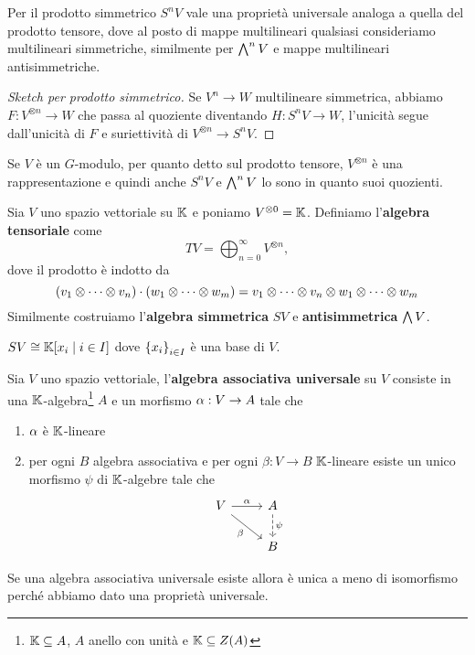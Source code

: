 \begin{remark}
Per il prodotto simmetrico $S^nV$ vale una propriet\`a universale analoga a quella del prodotto tensore, dove al posto di mappe multilineari qualsiasi consideriamo multilineari simmetriche, similmente per $\bigwedge^nV$ e mappe multilineari antisimmetriche.
\end{remark}
\begin{proof}[Sketch per prodotto simmetrico]
Se $V^n\to W$ multilineare simmetrica, abbiamo $F:V^{\otimes n}\to W$ che passa al quoziente diventando $H:S^nV\to W$, l'unicit\`a segue dall'unicit\`a di $F$ e suriettivit\`a di $V^{\otimes n}\to S^nV$.
\end{proof}

\begin{remark}
Se $V$ \`e un $G$-modulo, per quanto detto sul prodotto tensore, $V^{\otimes n}$ \`e una rappresentazione e quindi anche $S^nV$ e $\bigwedge^n V$ lo sono in quanto suoi quozienti.
\end{remark}


\begin{definition}
Sia $V$ uno spazio vettoriale su $\mathbb{K}$ e poniamo $V^{\otimes 0}=\mathbb{K}$. Definiamo l'\textbf{algebra tensoriale} come
\[TV=\bigoplus_{n=0}^\infty V^{\otimes n},\]
dove il prodotto \`e indotto da
\[\left({v_1\otimes\cdots\otimes v_n}\right)\cdot\left({w_1\otimes\cdots\otimes w_m}\right)=v_1\otimes\cdots\otimes v_n\otimes w_1\otimes\cdots\otimes w_m\]
Similmente costruiamo l'\textbf{algebra simmetrica} $SV$ e \textbf{antisimmetrica} $\bigwedge V$.
\end{definition}

\begin{remark}
$SV\cong \mathbb{K}[x_i\mid i\in I]$ dove $\left\{{x_i}\right\}_{i\in I}$ \`e una base di $V$.
\end{remark}


\begin{definition}
Sia $V$ uno spazio vettoriale, l'\textbf{algebra associativa universale} su $V$ consiste in una $\mathbb{K}$-algebra\footnote{$\mathbb{K}\subseteq A$, $A$ anello con unit\`a e $\mathbb{K}\subseteq Z(A)$} $A$ e un morfismo $\alpha:V\to A$ tale che
\begin{enumerate}
    \item $\alpha$ \`e $\mathbb{K}$-lineare
    \item per ogni $B$ algebra associativa e per ogni $\beta:V\to B$ $\mathbb{K}$-lineare esiste un unico morfismo $\psi$ di $\mathbb{K}$-algebre tale che
\[\begin{tikzcd}
	V & A \\
	& B
	\arrow["\al", from=1-1, to=1-2]
	\arrow["\beta"', from=1-1, to=2-2]
	\arrow["\psi", dashed, from=1-2, to=2-2]
\end{tikzcd}\]
\end{enumerate}
\end{definition}
\begin{remark}
Se una algebra associativa universale esiste allora \`e unica a meno di isomorfismo perch\'e abbiamo dato una propriet\`a universale.
\end{remark}

